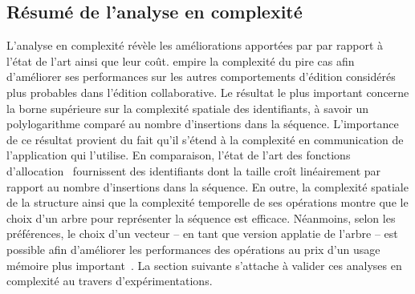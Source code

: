 \subsection{Résumé de l'analyse en complexité}

L'analyse en complexité révèle les améliorations apportées par \LSEQ par rapport
à l'état de l'art ainsi que leur coût. \LSEQ empire la complexité du pire cas
afin d'améliorer ses performances sur les autres comportements d'édition
considérés plus probables dans l'édition collaborative. Le résultat le plus
important concerne la borne supérieure sur la complexité spatiale des
identifiants, à savoir un polylogarithme comparé au nombre d'insertions dans la
séquence. L'importance de ce résultat provient du fait qu'il s'étend à la
complexité en communication de l'application qui l'utilise. En comparaison,
l'état de l'art des fonctions d'allocation~\cite{preguica2009commutative,
  weiss2009logoot} fournissent des identifiants dont la taille croît
linéairement par rapport au nombre d'insertions dans la séquence.  En outre, la
complexité spatiale de la structure ainsi que la complexité temporelle de ses
opérations montre que le choix d'un arbre pour représenter la séquence est
efficace. Néanmoins, selon les préférences, le choix d'un vecteur -- en tant que
version applatie de l'arbre -- est possible afin d'améliorer les performances
des opérations au prix d'un usage mémoire plus
important~\cite{weiss2009logoot}. La section suivante s'attache à valider ces
analyses en complexité au travers d'expérimentations.



%       

